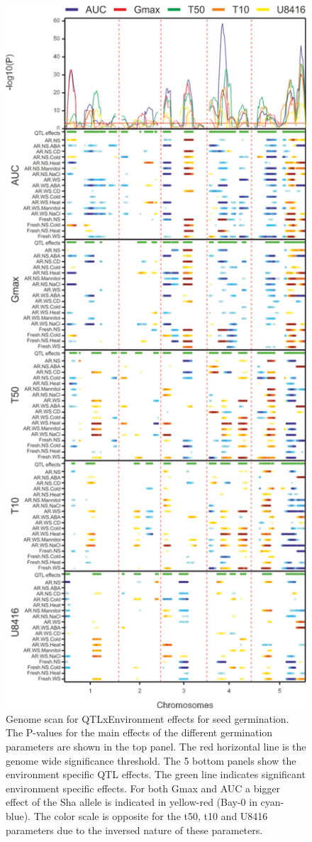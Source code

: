 \begin{figure}[h!]
  \centering
  \includegraphics[keepaspectratio,scale=0.30]{eps/image_3_1_7.eps}
  \caption[G:E genome wide QTL scan.]{Genome scan for QTLxEnvironment effects for seed germination. The P-values for 
          the main effects of the different germination parameters are shown in the top panel. The red horizontal line 
          is the genome wide significance threshold. The 5 bottom panels show the environment specific QTL effects. 
          The green line indicates significant environment specific effects. For both Gmax and AUC a bigger effect of 
          the Sha allele is indicated in yellow-red (Bay-0 in cyan-blue). The color scale is opposite for the t50, 
          t10 and U8416 parameters due to the inversed nature of these parameters.}
          \label{fig:gegenomewide}
\end{figure}

